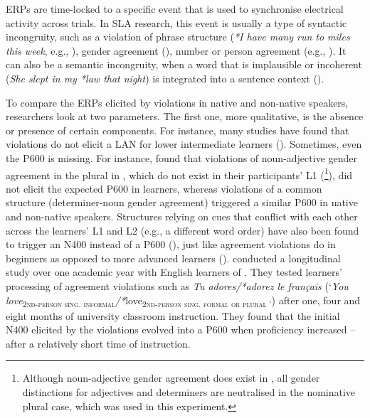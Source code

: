 \documentclass[output=paper,colorlinks,citecolor=brown,modfonts,nonflat]{../langscibook}
\begin{document}
ERPs are time-locked to a specific event that is used to synchronise electrical activity across trials. In SLA research, this event is usually a type of syntactic incongruity, such as a violation of phrase structure (\textit{*I have many run to miles this week}, e.g., \citealt{RossiEtAl2006,KotzEtAl2008,BowdenEtAl2013}), gender agreement (\citealt{Gillon-DowensEtAl2010,FoucartFrenck-Mestre2012}), number or person agreement (e.g., \citealt{RossiEtAl2006,TannerEtAl2009, TannerHell2014,Alemán-BañónEtAl2014, Alemán-BañónEtAl2017}). It can also be a semantic incongruity, when a word that is implausible or incoherent (\textit{She slept in my *law that night}) is integrated into a sentence context (\citealt{KutasHillyard1980,FriedericiEtAl1993,AstésanoEtAl2004,OjimaEtAl2005,WeissEtAl2005,DeLongEtAl2014,FoucartEtAl2014,SchneiderEtAl2016}).

To compare the ERPs elicited by violations in native and non-native speakers, researchers look at two parameters. The first one, more qualitative, is the absence or presence of certain components. For instance, many studies have found that violations do not elicit a LAN for lower intermediate learners (\citealt{OjimaEtAl2005,HahneEtAl2006,RossiEtAl2006,ChenEtAl2007}). Sometimes, even the P600 is missing. For instance, \citet{FoucartFrenck-Mestre2010} found that violations of noun-adjective gender agreement in the plural in , which do not exist in their participants’ L1 (\footnote{{Although noun-adjective gender agreement does exist in , all gender distinctions for adjectives and determiners are neutralised in the nominative plural case, which was used in this experiment.}}), did not elicit the expected P600 in learners, whereas violations of a common structure (determiner-noun gender agreement) triggered a similar P600 in native and non-native speakers. Structures relying on cues that conflict with each other across the learners’ L1 and L2 (e.g., a different word order) have also been found to trigger an N400 instead of a P600 (\citealt{FoucartFrenck-Mestre2012}), just like agreement violations do in beginners as opposed to more advanced learners (\citealt{OsterhoutEtAl2006,McLaughlinEtAl2010}). \citet{OsterhoutEtAl2006} conducted a longitudinal study over one academic year with English learners of . They tested learners’ processing of agreement violations such as \textit{Tu adores/*adorez le français} (‘\textit{You love}\textsubscript{\textsc{2nd-person sing. informal}}\textit{/*}love\textsubscript{\textsc{2nd-person sing. formal or plural} ’}) after one, four and eight months of university classroom instruction. They found that the initial N400 elicited by the violations evolved into a P600 when proficiency increased – after a relatively short time of instruction.
\end{document}
